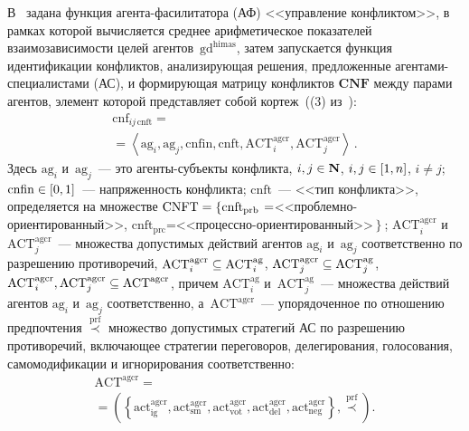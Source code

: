 \begin{multicols}{2}
  В~\cite{3-kir} задана функция агента-фа\-си\-ли\-та\-то\-ра (АФ)  
<<управ\-ле\-ние конфликтом>>, в рамках которой вы\-чис\-ля\-ет\-ся среднее 
арифметическое показателей взаимозависимости целей 
агентов~$\mathrm{gd}^{\mathrm{himas}}$, затем запускается 
функция идентификации конфликтов, анализирующая решения, предложенные 
агентами-специалистами (АС), и формирующая матрицу конфликтов 
$\mathbf{CNF}$ между парами агентов, элемент которой представляет собой 
кортеж~((3) из~\cite{3-kir}):
  \begin{multline}
  \mathrm{cnf}_{ij\,\mathrm{cnft}}={}\\
  {}=\left\langle \mathrm{ag}_i, \mathrm{ag}_j, 
\mathrm{cnfin}, \mathrm{cnft}, \mathrm{ACT}_i^{\mathrm{agcr}}, 
\mathrm{ACT}_j^{\mathrm{agcr}}\right\rangle\,.
\label{e1-kir}
  \end{multline}
Здесь $\mathrm{ag}_i$ и~$\mathrm{ag}_j$~--- это аген\-ты-субъ\-ек\-ты конфликта,  
$i,j\hm\in \mathbf{N}$, $i,j\hm\in [1,n]$, $i\not=j$; $\mathrm{cnfin}\hm\in [0,1]$~--- 
напряженность конфликта; $\mathrm{cnft}$~--- <<тип конфликта>>, \mbox{определяется} на 
множестве $\mathrm{CNFT}\hm = \left\{ \mathrm{cnft}_{\mathrm{prb}}\right.\hm =$\;<<проб\-лем\-но-ори\-ен\-ти\-ро\-ван\-ный>>, 
$\mathrm{cnft}_{\mathrm{prc}}$\;=\;<<про\-цес\-сно-ори\-ен\-ти\-ро\-ван\-ный>>$\left.\right\}$; 
$\mathrm{ACT}_i^{\mathrm{agcr}}$ и~$\mathrm{ACT}_j^{\mathrm{agcr}}$~--- множества допустимых действий агентов 
$\mathrm{ag}_i$ и~$\mathrm{ag}_j$ соответственно по разрешению противоречий,  
$\mathrm{ACT}_i^{\mathrm{agcr}}\hm\subseteq \mathrm{ACT}_i^{\mathrm{ag}}$, 
$\mathrm{ACT}_j^{\mathrm{agcr}}\hm\subseteq \mathrm{ACT}_j^{\mathrm{ag}}$, 
$\mathrm{ACT}_i^{\mathrm{agcr}}, \mathrm{ACT}_j^{\mathrm{agcr}} \hm\subseteq 
\mathrm{ACT}^{\mathrm{agcr}}$, 
  причем $\mathrm{ACT}_i^{\mathrm{ag}}$ и~$\mathrm{ACT}_j^{\mathrm{ag}}$~--- множества действий агентов 
$\mathrm{ag}_i$ и~$\mathrm{ag}_j$ соответственно, 
а~$\mathrm{ACT}^{\mathrm{agcr}}$~--- упорядоченное по отношению предпочтения 
$\overset{\mathrm{prf}}{\prec}$ множество допустимых стратегий АС по 
разрешению противоречий, включающее стратегии переговоров, 
делегирования, голосования, самомодификации и игнорирования 
соответственно:
\begin{multline*}
\mathrm{ACT}^{\mathrm{agcr}} ={}\\
{}=\left( \!\left\{ 
\mathrm{act}^{\mathrm{agcr}}_{\mathrm{ig}},  
\mathrm{act}^{\mathrm{agcr}}_{\mathrm{sm}}, 
\mathrm{act}^{\mathrm{agcr}}_{\mathrm{vot}}, 
\mathrm{act}^{\mathrm{agcr}}_{\mathrm{del}}, 
\mathrm{act}^{\mathrm{agcr}}_{\mathrm{neg}}\right\},\overset{\mathrm{prf}} 
{\prec}\right).
\end{multline*}
  

\end{multicols}

